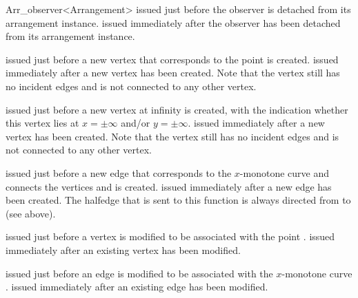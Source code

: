 \begin{ccRefClass}{Arr_observer<Arrangement>}
    {issued just before the observer is detached from its arrangement instance.}
\ccGlue
{}
    {issued immediately after the observer has been detached from its
     arrangement instance.}



    {issued just before a new vertex that corresponds to the point 
     is created.}
\ccGlue
{}
    {issued immediately after a new vertex  has been created.
     Note that the vertex still has no incident edges and is not connected
     to any other vertex.}

    {issued just before a new vertex at infinity is created, with the
     indication whether this vertex lies at $x = \pm\infty$ and/or
     $y = \pm\infty$.}
\ccGlue
{}
    {issued immediately after a new vertex  has been created.
     Note that the vertex still has no incident edges and is not connected
     to any other vertex.}

    {issued just before a new edge that corresponds to the $x$-monotone curve 
      and connects the vertices  and  is created.}
\ccGlue
{}
    {issued immediately after a new edge  has been created.
     The halfedge that is sent to this function is always directed from 
      to  (see above).}

    {issued just before a vertex  is modified to be associated with
     the point .}
\ccGlue
{}
    {issued immediately after an existing vertex  has been modified.}

    {issued just before an edge  is modified to be associated with
     the $x$-monotone curve .}
\ccGlue
{}
    {issued immediately after an existing edge  has been modified.}


\end{ccRefClass}
